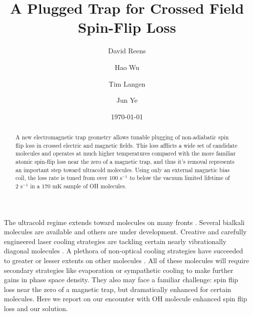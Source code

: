 \documentclass[%
 reprint,
 amsmath,amssymb,
 aps,
prl,
]{revtex4-1}
\begin{document}

\title{A Plugged Trap for Crossed Field Spin-Flip Loss}%


\author{David Reens}%
\author{Hao Wu}
\author{Tim Langen}%
\author{Jun Ye}
%

\date{\today}%


\begin{abstract}
A new electromagnetic trap geometry allows tunable plugging of non-adiabatic spin flip loss in crossed electric and magnetic fields. This loss afflicts a wide set of candidate molecules and operates at much higher temperatures compared with the more familiar atomic spin-flip loss near the zero of a magnetic trap, and thus it's removal represents an important step toward ultracold molecules. Using only an external magnetic bias coil, the loss rate is tuned from over $100 \text{ s}^{-1} $ to below the vacuum limited lifetime of $2 \text{ s}^{-1}$ in a $170 \text{ mK}$ sample of OH molecules.
\end{abstract}


\maketitle


%
%
The ultracold regime extends toward molecules on many fronts \cite{Carr2009}. Several bialkali molecules are available \cite{Ni2008, Takekoshi2014, Park2015} and others are under development. Creative and carefully engineered laser cooling strategies are tackling certain nearly vibrationally diagonal molecules \cite{Steinecker2016, Barry2014, Hemmerling2016, Hummon2013}. A plethora of non-optical cooling strategies have succeeded to greater or lesser extents on other molecules \cite{Doyle1998,Prehn2016,Bethlem1999,Bochinski2003,Akerman2015}. All of these molecules will require secondary strategies like evaporation or sympathetic cooling to make further gains in phase space density. They also may face a familiar challenge: spin flip loss near the zero of a magnetic trap, but dramatically enhanced for certain molecules. Here we report on our encounter with OH molecule enhanced spin flip loss and our solution.
\end{document}
